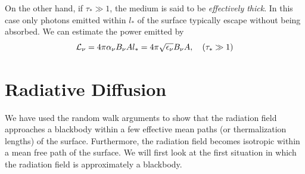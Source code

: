 On the other hand, if $\tau_* \gg 1$, the medium is said to be 
{\em effectively thick}.  In this case only photons emitted within
$l_*$ of the surface typically escape without being absorbed.  We can
estimate the power emitted by
\begin{equation}
{\cal L}_\nu = 4\pi \alpha_\nu B_\nu A l_* = 
4\pi \sqrt{\epsilon_\nu} B_\nu A, ~~~ (\tau_* \gg 1)
\label{eq:101}
\end{equation}

\section{Radiative Diffusion} 
\label{sec:radiative-diffusion}
We have used the random walk arguments to show that the radiation
field approaches a blackbody within a few effective mean paths (or
thermalization lengths) of the surface.  Furthermore, the radiation
field becomes isotropic within a mean free path of the surface.  We
will first look at the first situation in which the radiation field is
approximately a blackbody.

